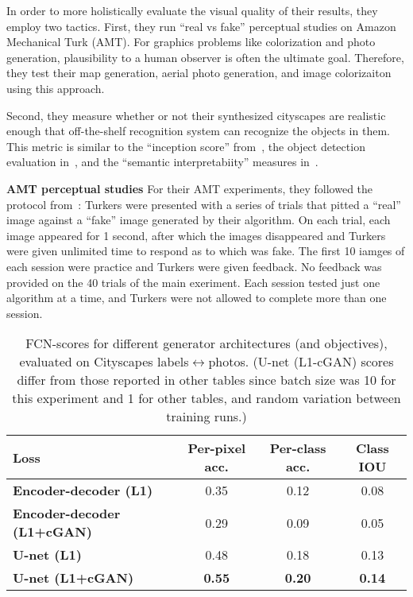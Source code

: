 \documentclass[10pt,twocolumn,letterpaper]{article}
\begin{document}
In order to more holistically evaluate the visual quality of their results, they employ two tactics. First, they run ``real vs fake'' perceptual studies on Amazon Mechanical Turk (AMT). For graphics problems like colorization and photo generation, plausibility to a human observer is often the ultimate goal. Therefore, they test their map generation, aerial photo generation, and image colorizaiton using this approach. 

Second, they measure whether or not their synthesized cityscapes are realistic enough that off-the-shelf recognition system can recognize the objects in them. This metric is similar to the ``inception score'' from~\cite{Improved}, the object detection evaluation in~\cite{Generative}, and the ``semantic interpretabiity'' measures in~\cite{Colorful}.

{\bf AMT perceptual studies} For their AMT experiments, they followed the protocol from~\cite{Colorful}: Turkers were presented with a series of trials that pitted a ``real'' image against a ``fake'' image generated by their algorithm. On each trial, each image appeared for 1 second, after which the images disappeared and Turkers were given unlimited time to respond as to which was fake. The first 10 iamges of each session were practice and Turkers were given feedback. No feedback was provided on the 40 trials of the main exeriment. Each session tested just one algorithm at a time, and Turkers were not allowed to complete more than one session.

\begin{table}
\scriptsize
\begin{center}
\begin{tabular}{lccc}
  {\bf Loss} & {\bf Per-pixel acc.} & {\bf Per-class acc.} & {\bf Class IOU} \\
  \hline
  {\bf Encoder-decoder (L1)} & 0.35 & 0.12 & 0.08 \\
  {\bf Encoder-decoder (L1+cGAN)} & 0.29 & 0.09 & 0.05 \\
  {\bf U-net (L1)} & 0.48 & 0.18 & 0.13 \\
  {\bf U-net (L1+cGAN)} & {\bf 0.55} & {\bf 0.20} & {\bf 0.14}
\end{tabular}
\end{center}
\caption{FCN-scores for different generator architectures (and objectives), evaluated on Cityscapes labels$\leftrightarrow$photos. (U-net (L1-cGAN) scores differ from those reported in other tables since batch size was 10 for this experiment and 1 for other tables, and random variation between training runs.)}
\label{tab1}
\end{table}
\end{document}
